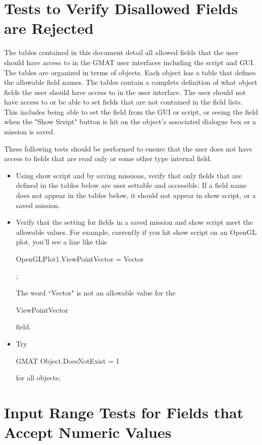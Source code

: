 \documentclass[10 pt]{book}
\newcommand{\st}[1]{\begin{ttfamily}#1\end{ttfamily}}
\begin{document}
\section{Tests to Verify Disallowed Fields are Rejected }

The tables contained in this document detail all allowed fields that
the user should have access to in the GMAT user interfaces including
the script and GUI.  The tables are organized in terms of objects.
Each object has a table that defines the allowable field names. The
tables contain a complete definition of what object fields the user
should have access to in the user interface.  The user should not
have access to or be able to set fields that are not contained in
the field lists. This includes being able to set the field from the
GUI or script, or seeing the field when the "Show Script" button is
hit on the object's associated dialogue box or a mission is saved.

These following tests should be performed to ensure that the user
does not have access to fields that are read only or some other type
internal field.

\begin{itemize}

\item Using show script and by saving missions, verify that only
fields that are defined in the tables below are user settable and
accessible.  If a field name does not appear in the tables below, it
should not appear in show script, or a saved mission.

\item Verify that the setting for fields in a saved mission and show
script meet the allowable values.  For example, currently if you hit
show script on an OpenGL plot, you'll see a line like this\\

\noindent \st{OpenGLPlot1.ViewPointVector = Vector};

The word ``Vector" is not an allowable value  for the
\st{ViewPointVector} field.

\item Try \st{GMAT Object.DoesNotExist = 1} for all objects;

\end{itemize}


\section{Input Range Tests for Fields that Accept Numeric Values }
\end{document}
